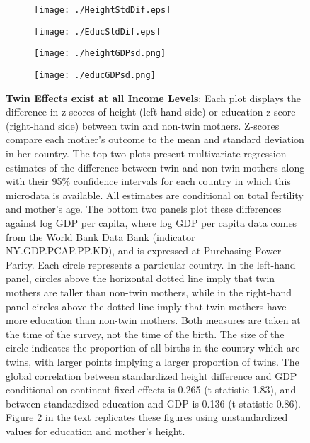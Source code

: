 \documentclass{nature}
\begin{document}
\begin{linenumbers}
\begin{spacing}{1}
\begin{figure}[htpb!]
\begin{subfigure}{.5\textwidth}
  \texttt{[image: ./HeightStdDif.eps]}
\end{subfigure}%
\begin{subfigure}{.5\textwidth}
  \texttt{[image: ./EducStdDif.eps]}
\end{subfigure}
\begin{subfigure}{.5\textwidth}
  \texttt{[image: ./heightGDPsd.png]}
\end{subfigure}%
\begin{subfigure}{.5\textwidth}
  \texttt{[image: ./educGDPsd.png]}
\end{subfigure}
\vspace{5mm}
\caption{\textbf{Twin Effects exist at all Income Levels}: Each plot displays the difference in z-scores of height (left-hand side) or education z-score (right-hand side) between twin and non-twin mothers. Z-scores compare each mother's outcome to the mean and standard deviation in her country.  The top two plots present multivariate regression estimates of the difference between twin and non-twin mothers along with their 95\% confidence intervals for each country in which this microdata is available.  All estimates are conditional on total fertility and mother's age.  The bottom two panels plot these differences against log GDP per capita, where log GDP per capita data comes from the World Bank Data Bank (indicator NY.GDP.PCAP.PP.KD), and is expressed at Purchasing Power Parity.  Each circle represents a particular country.  In the left-hand panel, circles above the horizontal dotted line imply that twin mothers are taller than non-twin mothers, while in the right-hand panel circles above the dotted line imply that twin mothers have more education than non-twin mothers.  Both measures are taken at the time of the survey, not the time of the birth.  The size of the circle indicates the proportion of all births in the country which are twins, with larger points implying a larger proportion of twins. The global correlation between standardized height difference and GDP conditional on continent fixed effects is 0.265 (t-statistic 1.83), and between standardized education and GDP is 0.136 (t-statistic 0.86). Figure 2 in the text replicates these figures using unstandardized values for education and mother's height.}
\end{figure}


\end{spacing}
\end{linenumbers}
\end{document}
